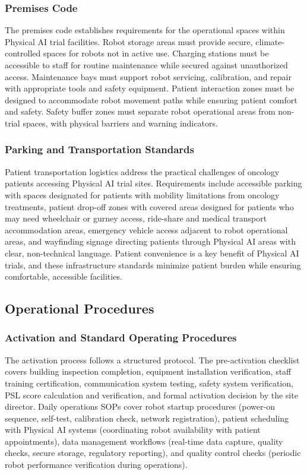 \subsubsection{Premises Code}

The premises code establishes requirements for the operational spaces within
Physical AI trial facilities. Robot storage areas must provide secure,
climate-controlled spaces for robots not in active use. Charging stations must
be accessible to staff for routine maintenance while secured against
unauthorized access. Maintenance bays must support robot servicing, calibration,
and repair with appropriate tools and safety equipment. Patient interaction
zones must be designed to accommodate robot movement paths while ensuring
patient comfort and safety. Safety buffer zones must separate robot operational
areas from non-trial spaces, with physical barriers and warning indicators.

\subsubsection{Parking and Transportation Standards}

Patient transportation logistics address the practical challenges of oncology
patients accessing Physical AI trial sites. Requirements include accessible
parking with spaces designated for patients with mobility limitations from
oncology treatments, patient drop-off zones with covered areas designed for
patients who may need wheelchair or gurney access, ride-share and medical
transport accommodation areas, emergency vehicle access adjacent to robot
operational areas, and wayfinding signage directing patients through Physical
AI areas with clear, non-technical language. Patient convenience is a key
benefit of Physical AI trials, and these infrastructure standards minimize
patient burden while ensuring comfortable, accessible facilities.

\subsection{Operational Procedures}
\label{subsec:site-operations}

\subsubsection{Activation and Standard Operating Procedures}

The activation process follows a structured protocol. The pre-activation
checklist covers building inspection completion, equipment installation
verification, staff training certification, communication system testing, safety
system verification, PSL score calculation and verification, and formal
activation decision by the site director. Daily operations SOPs cover robot
startup procedures (power-on sequence, self-test, calibration check, network
registration), patient scheduling with Physical AI systems (coordinating robot
availability with patient appointments), data management workflows (real-time
data capture, quality checks, secure storage, regulatory reporting), and
quality control checks (periodic robot performance verification during
operations).

